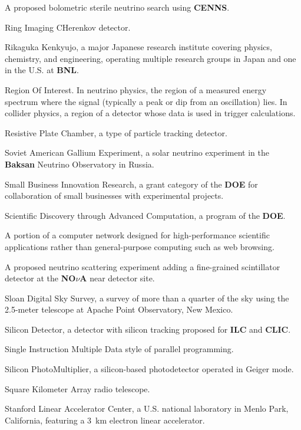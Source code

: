  A proposed bolometric sterile neutrino search
using {\bf CENNS}.

 Ring Imaging CHerenkov detector.

 Rikaguka Kenkyujo, a major Japanese research
institute covering physics, chemistry, and engineering, operating
multiple research groups in Japan and one in the U.S. at {\bf BNL}. 

 Region Of Interest.  In neutrino physics,  the region
of a measured energy spectrum where the signal (typically a peak or 
dip from an oscillation) lies.  In collider physics, a region of a
detector
whose data is used in trigger calculations.

 Resistive Plate Chamber, a type of particle tracking detector.

 Soviet American Gallium Experiment, a solar
neutrino experiment in the {\bf Baksan} Neutrino Observatory in Russia.

 Small Business Innovation Research, a grant category of the
{\bf DOE} for collaboration of small businesses with experimental projects. 

  Scientific Discovery through Advanced Computation,
     a program of the {\bf DOE}.

  A portion of a computer network designed for 
   high-performance scientific applications rather than
   general-purpose computing 
such as web browsing.
 

 A proposed neutrino scattering experiment adding a
fine-grained scintillator detector at the {\bf NO$\nu$A} near detector
site.

  Sloan Digital Sky Survey, a survey of more than a quarter of the sky
using the 2.5-meter telescope at Apache Point Observatory, New Mexico.

 Silicon Detector, a detector with silicon tracking 
proposed for {\bf ILC} and {\bf CLIC}. 


  Single Instruction Multiple Data style of parallel programming.

 Silicon PhotoMultiplier, a silicon-based photodetector
operated in Geiger mode.

  Square Kilometer Array radio telescope.

  Stanford Linear Accelerator Center,
a U.S. national laboratory in Menlo Park, California, featuring a 3~km electron linear
accelerator.

